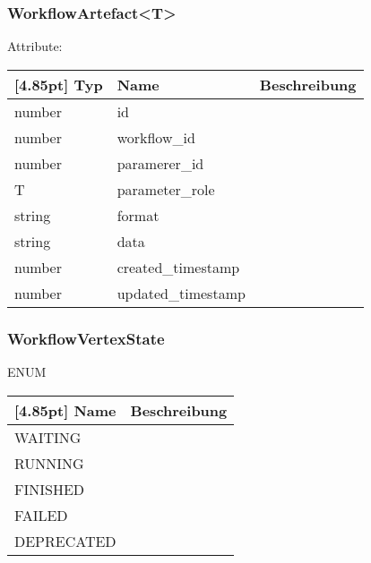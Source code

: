     		\subsubsection{WorkflowArtefact<T>}
    		
    		Attribute:
                \begin{center}
                	\renewcommand{\arraystretch}{1.5}
    	            \setlength\tabcolsep{5pt}
                	\begin{tabularx}{\textwidth}{|l|l|X|}
                		\hline
                        \rowcolor[gray]{0.75}[4.85pt]
                	    Typ & Name & Beschreibung \\ \hline
                		number & id &  \\ \hline
                		number & workflow_id &  \\ \hline
                		number & paramerer_id &  \\ \hline
                		T & parameter_role &  \\ \hline
                		string & format &  \\ \hline
                		string & data &  \\ \hline
                		number & created_timestamp &  \\ \hline
                		number & updated_timestamp &  \\ \hline
                	\end{tabularx}
                \end{center}
                
    		\subsubsection{WorkflowVertexState}
    		
    		ENUM
                \begin{center}
                	\renewcommand{\arraystretch}{1.5}
    	            \setlength\tabcolsep{5pt}
                	\begin{tabularx}{\textwidth}{|l|X|}
                		\hline
                        \rowcolor[gray]{0.75}[4.85pt]
                	    Name & Beschreibung \\ \hline
                		WAITING &   \\ \hline
                		RUNNING &   \\ \hline
                		FINISHED  &  \\ \hline
                		FAILED  &  \\ \hline
                		DEPRECATED  &  \\ \hline
                	\end{tabularx}
                \end{center}
                
